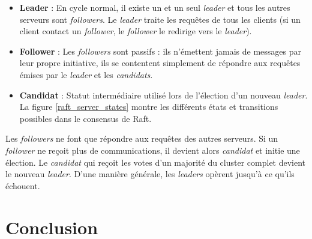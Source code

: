 \begin{itemize}
    \item \textbf{Leader} :
        En cycle normal, il existe un et un seul \emph{leader} et tous les autres
        serveurs sont \emph{followers}. Le \emph{leader} traite les requêtes de
        tous les clients (si un client contact un \emph{follower}, le
        \emph{follower} le redirige vers le \emph{leader}).
    \item \textbf{Follower} :
        Les \emph{followers} sont passifs : ils n'émettent jamais de messages par
        leur propre initiative, ils se contentent simplement de répondre aux
        requêtes émises par le \emph{leader} et les \emph{candidats}.
    \item \textbf{Candidat} :
        Statut intermédiaire utilisé lors de l'élection d'un nouveau
        \emph{leader}. La figure \ref{raft_server_states} montre les différents états
        et transitions possibles dans le consensus de Raft.
\end{itemize}

Les \emph{followers} ne font que répondre aux requêtes des autres serveurs. Si
un \emph{follower} ne reçoit plus de communications, il devient alors
\emph{candidat} et initie une élection. Le \emph{candidat} qui reçoit les votes
d'un majorité du cluster complet devient le nouveau \emph{leader}. D'une manière
générale, les \emph{leaders} opèrent jusqu'à ce qu'ils échouent.

\section{Conclusion}




